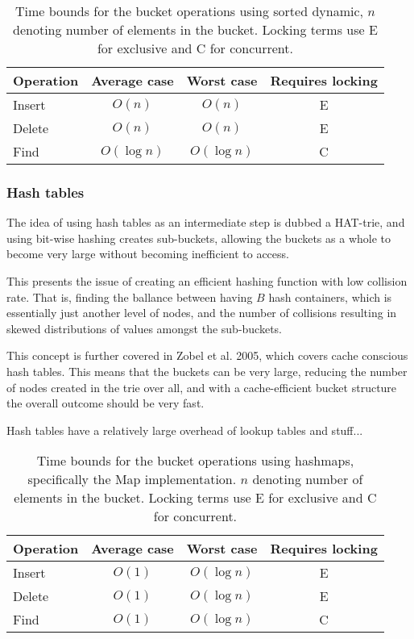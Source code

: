 \begin{table}[h!]
    \centering
    \begin{tabular}[here]{ l || c | c | c}
        Operation & Average case & Worst case & Requires locking  \\ \hline
        Insert    & $O(n)$ & $O(n)$           & E \\ \hline
        Delete    & $O(n)$ & $O(n)$           & E \\ \hline
        Find      & $O(\log n)$ & $O(\log n)$ & C  \\ \hline
    \end{tabular}
    \caption{Time bounds for the bucket operations using sorted dynamic,
    $n$ denoting number of elements in the bucket. Locking terms use E for
        exclusive and C for concurrent.}
    \label{tab:bounds:sortedarray}
\end{table}


\subsubsection{Hash tables}
The idea of using hash tables as an intermediate step is dubbed a HAT-trie,
and using bit-wise hashing creates sub-buckets, allowing the buckets
as a whole to become very large without becoming inefficient to access.

This presents the issue of creating an efficient hashing function with
low collision rate. That is, finding the ballance between having $B$
hash containers, which is essentially just another level of nodes, and
the number of collisions resulting in skewed distributions of values amongst
the sub-buckets. 

This concept is further covered in Zobel et al. 2005, which covers cache conscious
hash tables. This means that the buckets can be very large, reducing the number of
nodes created in the trie over all, and with a cache-efficient bucket structure
the overall outcome should be very fast.


Hash tables have a relatively large overhead of lookup tables and stuff...

\begin{table}[h!]
    \centering
    \begin{tabular}[here]{ l || c | c | c}
        Operation & Average case & Worst case & Requires locking  \\ \hline
        Insert    & $O(1)$  & $O(\log n)$ & E \\ \hline
        Delete    & $O(1)$  & $O(\log n)$ & E \\ \hline
        Find      & $O(1)$  & $O(\log n)$ & C \\ \hline
    \end{tabular}
    \caption{Time bounds for the bucket operations using hashmaps, specifically
    the \STL Map implementation. $n$ denoting number of elements in the
    bucket. Locking terms use E for exclusive and C for concurrent.}

    \label{tab:bounds:hashmap}
\end{table}

